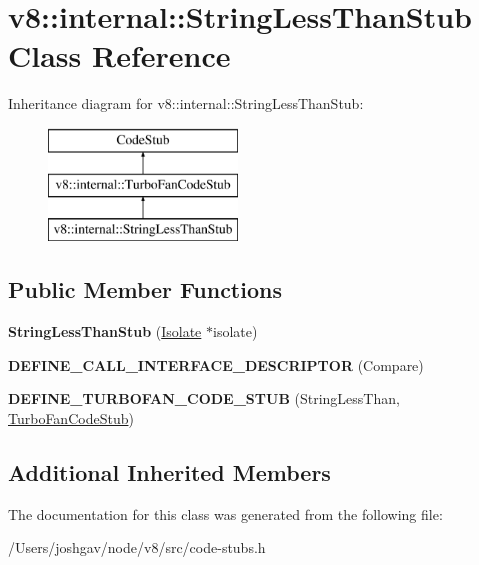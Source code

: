 \hypertarget{classv8_1_1internal_1_1_string_less_than_stub}{}\section{v8\+:\+:internal\+:\+:String\+Less\+Than\+Stub Class Reference}
\label{classv8_1_1internal_1_1_string_less_than_stub}
Inheritance diagram for v8\+:\+:internal\+:\+:String\+Less\+Than\+Stub\+:\begin{figure}[H]
\begin{center}
\leavevmode
\includegraphics[height=3.000000cm]{classv8_1_1internal_1_1_string_less_than_stub}
\end{center}
\end{figure}
\subsection*{Public Member Functions}
\begin{DoxyCompactItemize}
\item 
{\bfseries String\+Less\+Than\+Stub} (\hyperlink{classv8_1_1internal_1_1_isolate}{Isolate} $\ast$isolate)\hypertarget{classv8_1_1internal_1_1_string_less_than_stub_afff3d1239feb8118643d876954008d43}{}\label{classv8_1_1internal_1_1_string_less_than_stub_afff3d1239feb8118643d876954008d43}

\item 
{\bfseries D\+E\+F\+I\+N\+E\+\_\+\+C\+A\+L\+L\+\_\+\+I\+N\+T\+E\+R\+F\+A\+C\+E\+\_\+\+D\+E\+S\+C\+R\+I\+P\+T\+OR} (Compare)\hypertarget{classv8_1_1internal_1_1_string_less_than_stub_a73a508d4f15f258f4242a5c57ff533ea}{}\label{classv8_1_1internal_1_1_string_less_than_stub_a73a508d4f15f258f4242a5c57ff533ea}

\item 
{\bfseries D\+E\+F\+I\+N\+E\+\_\+\+T\+U\+R\+B\+O\+F\+A\+N\+\_\+\+C\+O\+D\+E\+\_\+\+S\+T\+UB} (String\+Less\+Than, \hyperlink{classv8_1_1internal_1_1_turbo_fan_code_stub}{Turbo\+Fan\+Code\+Stub})\hypertarget{classv8_1_1internal_1_1_string_less_than_stub_a75a6a4ad587ad516299e50b8359f17bb}{}\label{classv8_1_1internal_1_1_string_less_than_stub_a75a6a4ad587ad516299e50b8359f17bb}

\end{DoxyCompactItemize}
\subsection*{Additional Inherited Members}


The documentation for this class was generated from the following file\+:\begin{DoxyCompactItemize}
\item 
/\+Users/joshgav/node/v8/src/code-\/stubs.\+h\end{DoxyCompactItemize}
